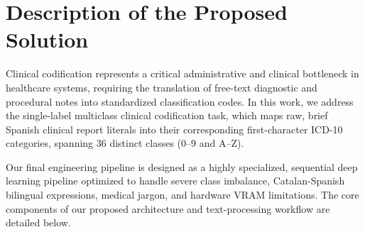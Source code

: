 \documentclass{article}
\begin{document}

\section{Description of the Proposed Solution}
Clinical codification represents a critical administrative and clinical bottleneck in healthcare systems, requiring the translation of free-text diagnostic and procedural notes into standardized classification codes. In this work, we address the single-label multiclass clinical codification task, which maps raw, brief Spanish clinical report literals into their corresponding first-character ICD-10 categories, spanning 36 distinct classes ($0\text{--}9$ and $\text{A}\text{--}\text{Z}$). 

Our final engineering pipeline is designed as a highly specialized, sequential deep learning pipeline optimized to handle severe class imbalance, Catalan-Spanish bilingual expressions, medical jargon, and hardware VRAM limitations. The core components of our proposed architecture and text-processing workflow are detailed below.
\end{document}
